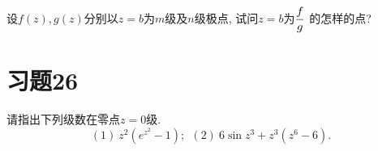 \begin{yyEx}
	设$f(z),g(z)$分别以$z = b$为$m$级及$n$级极点, 试问$z = b$为$\begin{lgathered}
		\frac{f}{g}
	\end{lgathered}$
	的怎样的点?
\end{yyEx}

\section{习题26}

\begin{yyEx}
	请指出下列级数在零点$z = 0$级.
	\begin{equation*}
		(1)~z^2(e^{z^2} - 1);~~(2)~6\sin z^3+z^3(z^6-6).
	\end{equation*}
\end{yyEx}